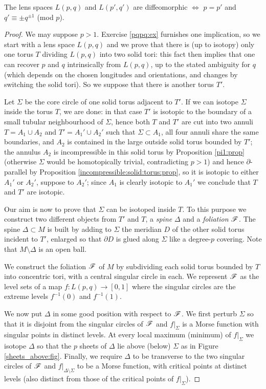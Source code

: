 \begin{teo} \label{Lpq:teo}
The lens spaces $L(p,q)$ and $L(p',q')$ are diffeomorphic $\Longleftrightarrow$ $p=p'$ and $q' \equiv \pm q^{\pm 1}$ (mod $p$).
\end{teo}
\begin{proof}
We may suppose $p>1$.
Exercise \ref{pqpq:ex} furnishes one implication, so we start with a lens space $L(p,q)$ and we prove that there is (up to isotopy) only one torus $T$ dividing $L(p,q)$ into two solid tori: this fact then implies that one can recover $p$ and $q$ intrinsically from $L(p,q)$, up to the stated ambiguity for $q$ (which depends on the chosen longitudes and orientations, and changes by switching the solid tori). So we suppose that there is another torus $T'$.

Let $\Sigma$ be the core circle of one solid torus adjacent to $T'$. If we can isotope $\Sigma$ inside the torus $T$, we are done: in that case $T'$ is isotopic to the boundary of a small tubular neighbourhood of $\Sigma$, hence both $T$ and $T'$ are cut into two annuli $T = A_1 \cup A_2$ and $T' = A_1' \cup A_2'$ such that $\Sigma \subset A_1$, all four annuli share the same boundaries, and $A_2$ is contained in the large outside solid torus bounded by $T'$; the annulus $A_2$ is incompressible in this solid torus by Proposition \ref{pi1:prop} (otherwise $\Sigma$ would be homotopically trivial, contradicting $p>1$) and hence $\partial$-parallel by Proposition \ref{incompressible:solid:torus:prop}, so it is isotopic to either $A_1'$ or $A_2'$, suppose to $A_2'$; since $A_1$ is clearly isotopic to $A_1'$ we conclude that $T$ and $T'$ are isotopic.

Our aim is now to prove that $\Sigma$ can be isotoped inside $T$. To this purpose we construct two different objects from $T'$ and $T$, a \emph{spine} $\Delta$ and a \emph{foliation} $\mathscr{F}$. The spine $\Delta\subset M$ is built by adding to $\Sigma$ the meridian $D$ of the other solid torus incident to $T'$, enlarged so that $\partial D$ is glued along $\Sigma$ like a degree-$p$ covering. Note that $M\setminus \Delta$ is an open ball.

We construct the foliation $\mathscr{F}$ of $M$ by subdividing each solid torus bounded by $T$ into concentric tori, with a central singular circle in each. We represent $\mathscr{F}$ as the level sets of a map $f\colon L(p,q) \to [0,1]$ where the singular circles are the extreme levels $f^{-1}(0)$ and $f^{-1}(1)$.

We now put $\Delta$ in some good position with respect to $\mathscr{F}$. We first perturb $\Sigma$ so that it is disjoint from the singular circles of $\mathscr{F}$ and $f|_\Sigma$ is a Morse function with singular points in distinct levels. At every local maximum (minimum) of $f|_\Sigma$ we isotope $\Delta$ so that the $p$ sheets of $\Delta$ lie above (below) $\Sigma$ as in Figure \ref{sheets_above:fig}. Finally, we require $\Delta$ to be transverse to the two singular circles of $\mathscr{F}$ and $f|_{\Delta \setminus \Sigma}$ to be a Morse function, with critical points at distinct levels (also distinct from those of the critical points of $f|_\Sigma$).


\end{proof}

